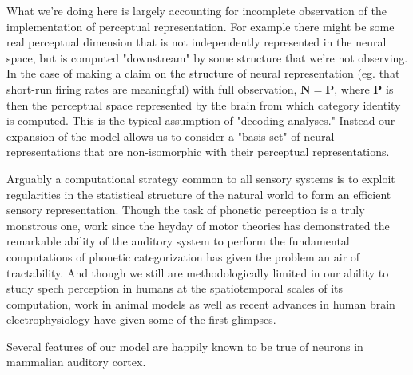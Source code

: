 What we're doing here is largely accounting for incomplete observation of the implementation of perceptual representation. For example there might be some real perceptual dimension that is not independently represented in the neural space, but is computed "downstream" by some structure that we're not observing. In the case of making a claim on the structure of neural representation (eg. that short-run firing rates are meaningful) with full observation, $\mathbf{N} = \mathbf{P}$,  where $\mathbf{P}$ is then the perceptual space represented by the brain from which category identity is computed. This is the typical assumption of "decoding analyses." Instead our expansion of the model allows us to consider a "basis set" of neural representations that are non-isomorphic with their perceptual representations.

Arguably a computational strategy common to all sensory systems is to exploit regularities in the statistical structure of the natural world to form an efficient sensory representation\citep{kuhlBrainMechanismsEarly2010,kingRecentAdvancesUnderstanding2018a,smithEfficientAuditoryCoding2006a,stilpRapidEfficientCoding2010,schiavoCapacitiesNeuralMechanisms2019,barlowSingleUnitsSensation1972}. Though the task of phonetic perception is a truly monstrous one, work since the heyday of motor theories has demonstrated the remarkable ability of the auditory system to perform the fundamental computations of phonetic categorization has given the problem an air of tractability. And though we still are methodologically limited in our ability to study spech perception in humans at the spatiotemporal scales of its computation, work in animal models as well as recent advances in human brain electrophysiology have given some of the first glimpses. 

Several features of our model are happily known to be true of neurons in mammalian auditory cortex. 

